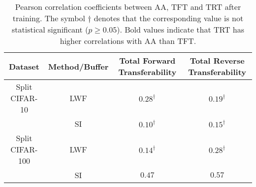 \begin{table*}[ht]
\centering
\small
\begin{tabular}{cccc}
\hline
Dataset         & Method/Buffer & Total Forward Transferability & Total Reverse Transferability \\ \hline
Split CIFAR-10  & LWF           & $0.28^{\dagger}$              & $0.19^{\dagger}$              \\
                & SI            & $0.10^{\dagger}$                        & $\mathbf{0.15^{\dagger}}$               \\ \hline
Split CIFAR-100 & LWF           & $0.14^{\dagger}$             & $\mathbf{0.28^{\dagger}}$     \\
                & SI            & $0.47$                        & $\mathbf{0.57}$              
\end{tabular}
\par{\text{}}
\caption{Pearson correlation coefficients between AA, TFT and TRT after training. The symbol $\dagger$ denotes that the corresponding value is not statistical significant ($p\geq0.05$). Bold values indicate that TRT has higher correlations with AA than TFT.}
\vspace*{-0.1in}
\label{table:correlation:no_buffer}
\end{table*}
